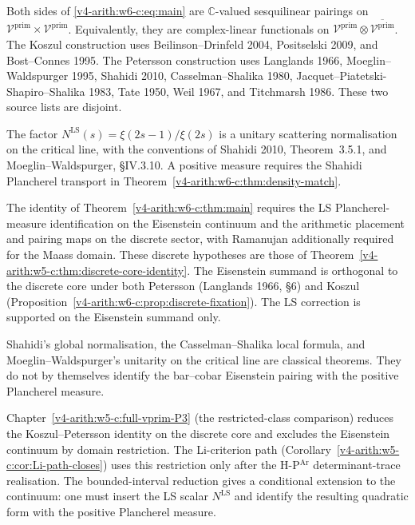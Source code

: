 \begin{remark}
\label{v4-arith:w6-c:rem:disjointness-comparison}
Both sides of \eqref{v4-arith:w6-c:eq:main} are
\(\mathbb C\)-valued sesquilinear pairings on
\(\mathcal V^{\mathrm{prim}}\times\mathcal V^{\mathrm{prim}}\).
Equivalently, they are complex-linear functionals on
\(\mathcal V^{\mathrm{prim}}\otimes\overline{\mathcal V^{\mathrm{prim}}}\).
The Koszul construction uses Beilinson--Drinfeld 2004,
Positselski 2009, and Bost--Connes 1995. The Petersson construction
uses Langlands 1966, Moeglin--Waldspurger 1995, Shahidi 2010,
Casselman--Shalika 1980, Jacquet--Piatetski-Shapiro--Shalika 1983,
Tate 1950, Weil 1967, and Titchmarsh 1986. These two source lists
are disjoint.

The factor
\(N^{\mathrm{LS}}(s)=\xi(2s-1)/\xi(2s)\) is a unitary
scattering normalisation on the critical line, with the conventions
of Shahidi 2010, Theorem~3.5.1, and
Moeglin--Waldspurger, \S IV.3.10. A positive measure requires the
Shahidi Plancherel transport in
Theorem~\ref{v4-arith:w6-c:thm:density-match}.

The identity of Theorem~\ref{v4-arith:w6-c:thm:main} requires the
LS Plancherel-measure identification on the Eisenstein continuum
and the arithmetic placement and pairing maps on the discrete
sector, with Ramanujan additionally required for the Maass domain.
These discrete hypotheses are those of
Theorem~\ref{v4-arith:w5-c:thm:discrete-core-identity}.
The Eisenstein summand is orthogonal to the discrete core under
both Petersson (Langlands 1966, \S6) and Koszul
(Proposition~\ref{v4-arith:w6-c:prop:discrete-fixation}).
The LS correction is supported on the Eisenstein summand only.

Shahidi's global normalisation, the Casselman--Shalika local formula,
and Moeglin--Waldspurger's unitarity on the critical line are
classical theorems. They do not by themselves identify the
bar--cobar Eisenstein pairing with the positive Plancherel measure.
\end{remark}

\begin{remark}
\label{v4-arith:w6-c:rem:form}
Chapter~\ref{v4-arith:w5-c:full-vprim-P3} (the restricted-class comparison) reduces the
Koszul--Petersson identity on the discrete core and excludes the
Eisenstein continuum by domain restriction. The
Li-criterion path (Corollary~\ref{v4-arith:w5-c:cor:Li-path-closes}) uses
this restriction only after the H-P\(^{\mathrm{Ar}}\) determinant-trace
realisation.
The bounded-interval reduction gives a conditional extension to the continuum:
one must insert the LS scalar \(N^{\mathrm{LS}}\) and identify
the resulting quadratic form with the positive Plancherel measure.
\end{remark}

